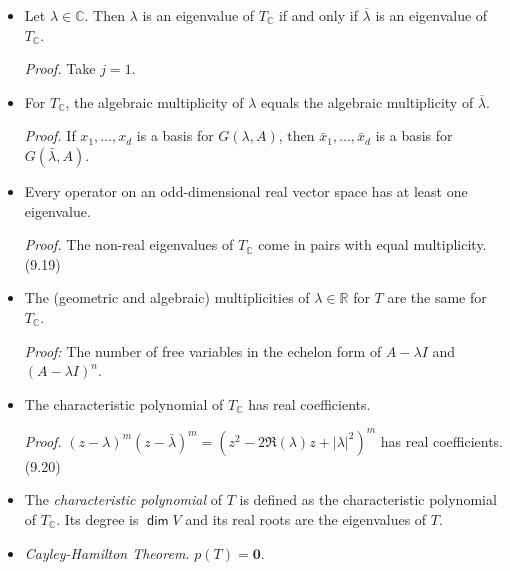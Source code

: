\documentclass[11pt]{article}
\newcommand{\1}{\mathbf{1}}
\newcommand{\0}{\mathbf{0}}
\newcommand{\C}{\mathbb{C}}
\newcommand{\R}{\mathbb{R}}
\DeclareMathOperator{\mydim}{\mathsf{dim}}
\newcommand{\spitem}{\item[$\circ$]}
\begin{document}
{\begin{itemize}
\emph{Proof.}
$(A - \bar\lambda I)^j \bar x = (\bar A - \bar\lambda \bar I)^j \bar x = \overline{(A - \lambda I)}^j \bar x = \overline{(A - \lambda I)^j x}$.
\hfill
(here)

\item

Let $\lambda\in\mathbb{C}$. Then $\lambda$ is an eigenvalue of $T_{\mathbb{C}}$ if and only if $\overline{\lambda}$ is an eigenvalue of $T_{\mathbb{C}}$.

\emph{Proof.}
Take $j=1$.

\spitem

For $T_\C$, the algebraic multiplicity of $\lambda$ equals the algebraic multiplicity of $\overline{\lambda}$.

\emph{Proof.}
If $x_1,\dots,x_d$ is a basis for $G(\lambda,A)$, then $\bar x_1, \dots, \bar x_d$ is a basis for $G(\bar\lambda,A)$.

\item

Every operator on an odd-dimensional real vector space has at least one eigenvalue.

\emph{Proof.}
The non-real eigenvalues of $T_\C$ come in pairs with equal multiplicity.
\hfill
(9.19)

\spitem

The (geometric and algebraic) multiplicities of $\lambda\in\R$ for $ T $ are the same for $ T_\C $.

\emph{Proof:}
The number of free variables in the echelon form of $ A-\lambda I $ and $ (A-\lambda I)^n $.

%

\item

The characteristic polynomial of $T_{\mathbb{C}}$ has real coefficients.

\emph{Proof.}
$(z-\lambda)^m (z- \bar \lambda)^m = (z^2 - 2 \Re(\lambda)z + |\lambda|^2)^m$ has real coefficients.
\hfill
(9.20)

\spitem

The \emph{characteristic polynomial} of $T$ is defined as the characteristic polynomial of $T_{\mathbb{C}}$.
Its degree is $\mydim V$ and its real roots are the eigenvalues of $T$.

\item

\emph{Cayley-Hamilton Theorem.}
$p(T)=\0$.


\end{itemize}}
\end{document}
